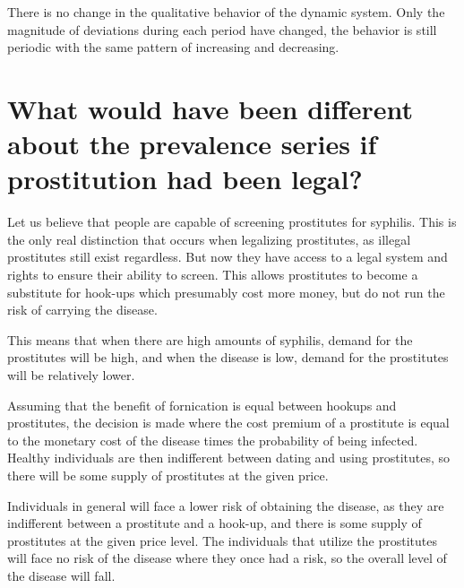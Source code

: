 \documentclass[12pt]{paper}
\begin{document}
There is no change in the qualitative behavior of the dynamic
system. Only the magnitude of deviations during each period have
changed, the behavior is still periodic with the same pattern of
increasing and decreasing. 



\section*{What would have been different about the prevalence series
  if prostitution had been legal?}


Let us believe that people are capable of screening prostitutes for
syphilis. This is the only real distinction that occurs when
legalizing prostitutes, as illegal prostitutes still exist
regardless. But now they have access to a legal system and rights to
ensure their ability to screen. This allows prostitutes to become a
substitute for hook-ups which presumably cost more money, but do not
run the risk of carrying the disease.

This means that when there are high amounts of syphilis, demand for
the prostitutes will be high, and when the disease is low, demand for
the prostitutes will be relatively lower.

Assuming that the benefit of fornication is equal between hookups and
prostitutes, the decision is made where the cost premium of a
prostitute is equal to the monetary cost of the disease times the
probability of being infected. Healthy individuals are then
indifferent between dating and using prostitutes, so there will be
some supply of prostitutes at the given price.

Individuals in general will face a lower risk of obtaining the
disease, as they are indifferent between a prostitute and a hook-up,
and there is some supply of prostitutes at the given price level. The
individuals that utilize the prostitutes will face no risk of the
disease where they once had a risk, so the overall level of the
disease will fall.
\end{document}
